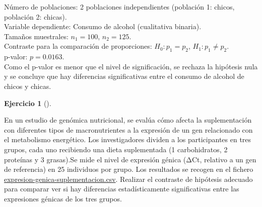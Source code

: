 \documentclass[
  a4paper,
]{scrreport}
\theoremstyle{definition}
\newtheorem{exercise}{Ejercicio}[chapter]
\theoremstyle{remark}
\begin{document}
\begin{tcolorbox}[enhanced jigsaw, breakable, opacityback=0, colbacktitle=quarto-callout-tip-color!10!white, colframe=quarto-callout-tip-color-frame, left=2mm, titlerule=0mm, coltitle=black, colback=white, bottomtitle=1mm, toptitle=1mm, opacitybacktitle=0.6, title=\textcolor{quarto-callout-tip-color}{\faLightbulb}\hspace{0.5em}{Solución}, leftrule=.75mm, bottomrule=.15mm, toprule=.15mm, rightrule=.15mm, arc=.35mm]

Número de poblaciones: 2 poblaciones independientes (población 1:
chicos, población 2: chicas).\\
Variable dependiente: Consumo de alcohol (cualitativa binaria).\\
Tamaños muestrales: \(n_1=100\), \(n_2=125\).\\
Contraste para la comparación de proporciones: \(H_0:p_1=p_2\),
\(H_1:p_1\neq p_2\).\\
p-valor: \(p=0.0163\).\\
Como el p-valor es menor que el nivel de significación, se rechaza la
hipótesis nula y se concluye que hay diferencias significativas entre el
consumo de alcohol de chicos y chicas.

\end{tcolorbox}

\begin{exercise}[]\protect\hypertarget{exr-contraste-anova-suplementacion}{}\label{exr-contraste-anova-suplementacion}

En un estudio de genómica nutricional, se evalúa cómo afecta la
suplementación con diferentes tipos de macronutrientes a la expresión de
un gen relacionado con el metabolismo energético. Los investigadores
dividen a los participantes en tres grupos, cada uno recibiendo una
dieta suplementada (1 carbohidratos, 2 proteínas y 3 grasas).Se mide el
nivel de expresión génica (ΔCt, relativo a un gen de referencia) en 25
individuos por grupo. Los resultados se recogen en el fichero
\href{datos/expresion-genica-suplementacion.csv}{expresion-genica-suplementacion.csv}.
Realizar el contraste de hipótesis adecuado para comparar ver si hay
diferencias estadísticamente significativas entre las expresiones
génicas de los tres grupos.

\end{exercise}
\end{document}
